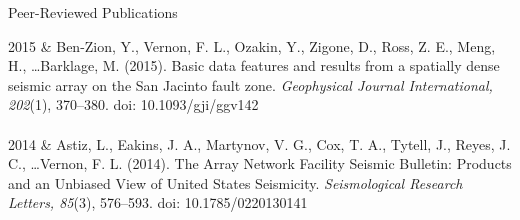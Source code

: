 \begin{rSection}{Peer-Reviewed Publications}
\begin{timeline}
		2015 & Ben-Zion, Y., Vernon, F. L., Ozakin, Y., Zigone, D., Ross, Z. E., Meng, H., \dots Barklage, M. (2015). Basic data features and results from a spatially dense seismic array on the San Jacinto fault zone. \textit{Geophysical Journal International, 202}(1), 370–380. doi: 10.1093/gji/ggv142 \\ \\         
		
		2014 & Astiz, L., Eakins, J. A., Martynov, V. G., Cox, T. A., Tytell, J., Reyes, J. C., \dots Vernon, F. L. (2014). The Array Network Facility Seismic Bulletin: Products and an Unbiased View of United States Seismicity. \textit{Seismological Research Letters, 85}(3), 576–593. doi: 10.1785/0220130141
		
	\end{timeline}
\end{rSection}